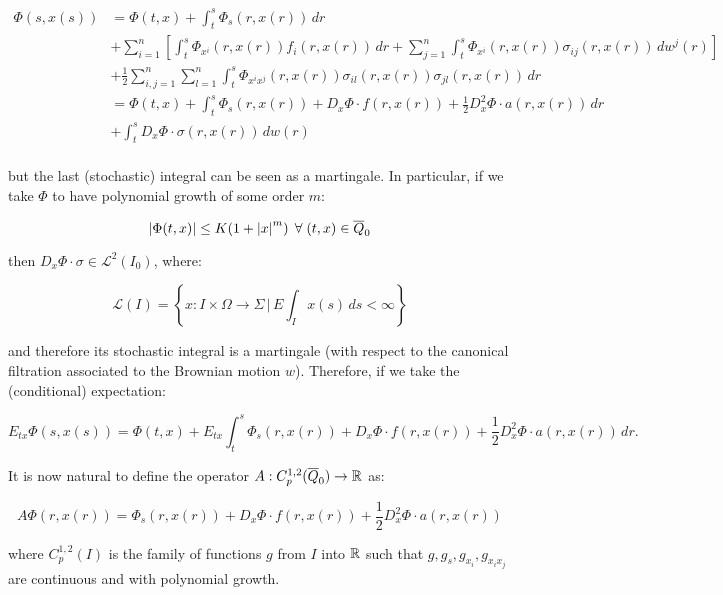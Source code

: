 \begin{align}
    \Phi(s,x(s)) & = \Phi(t,x) + \int_t^s\Phi_s(r,x(r))\,dr \\
    & + \sum_{i=1}^n \left[\int_t^s \Phi_{x^i}(r,x(r))f_i(r,x(r))\,dr + \sum_{j=1}^n\int_t^s\Phi_{x^i}(r,x(r))\sigma_{ij}(r,x(r))\,dw^j(r)\right] \\
    & + \frac{1}{2}\sum_{i,j=1}^n \sum_{l=1}^n\int_t^s\Phi_{x^ix^j}(r,x(r))\sigma_{il}(r,x(r))\sigma_{jl}(r,x(r))\,dr \\
    & = \Phi(t,x) + \int_t^s \Phi_s(r,x(r)) + D_x\Phi\cdot f(r,x(r)) + \frac{1}{2}D^2_x\Phi\cdot a(r,x(r)) \,dr \\
    & + \int_t^s D_x\Phi\cdot\sigma(r,x(r)) \,dw(r) \\
\end{align}

but the last (stochastic) integral can be seen as a martingale. In particular, if we take $\Phi$ to have polynomial growth of some order $m$:

\begin{equation}
    \abs{\Phi(t,x)} \leq K(1+\abs{x}^m)\,\forall(t,x)\in\overline{Q}_0
\end{equation}

then $D_x\Phi\cdot\sigma\in\mathcal{L}^2(I_0)$, where:

\[\mathcal{L}(I) = \left\{x:I\times\Omega\rightarrow\Sigma\,|\,E\int_Ix(s)\,ds<\infty\right\}\]

and therefore its stochastic integral is a martingale (with respect to the canonical filtration associated to the Brownian motion $w$). 
Therefore, if we take the (conditional) expectation:

\begin{equation}
    E_{tx}\Phi(s,x(s)) = \Phi(t,x) + E_{tx}\int_t^s \Phi_s(r,x(r)) + D_x\Phi\cdot f(r,x(r)) + \frac{1}{2}D^2_x\Phi\cdot a(r,x(r))\,dr.
\end{equation}

It is now natural to define the operator $A:C_p^{1,2}(\overline{Q}_0)\rightarrow\mathbb{R}$ as:

\begin{equation}\label{2-1-newdefA}
    A\Phi(r,x(r)) = \Phi_s(r,x(r)) + D_x\Phi\cdot f(r,x(r)) + \frac{1}{2}D^2_x\Phi\cdot a(r,x(r))
\end{equation}

where $C_p^{1,2}(I)$ is the family of functions $g$ from $I$ into $\mathbb{R}$ such that $g,g_s,g_{x_i},g_{x_ix_j}$ are continuous and with polynomial growth.

